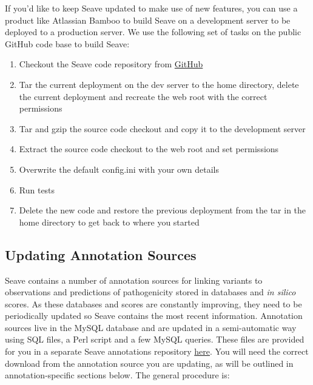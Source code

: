 \documentclass[11pt, a4paper]{article}
\begin{document}
If you'd like to keep Seave updated to make use of new features, you can use a product like Atlassian Bamboo to build Seave on a development server to be deployed to a production server. We use the following set of tasks on the public GitHub code base to build Seave:

\begin{enumerate}
\item Checkout the Seave code repository from \href{https://github.com/KCCG/seave}{GitHub}
\item Tar the current deployment on the dev server to the home directory, delete the current deployment and recreate the web root with the correct permissions
\item Tar and gzip the source code checkout and copy it to the development server 
\item Extract the source code checkout to the web root and set permissions
\item Overwrite the default config.ini with your own details
\item Run tests
\item Delete the new code and restore the previous deployment from the tar in the home directory to get back to where you started
\end{enumerate}


\subsection{Updating Annotation Sources}\label{updateAnnotations}

Seave contains a number of annotation sources for linking variants to observations and predictions of pathogenicity stored in databases and \textit{in silico} scores. As these databases and scores are constantly improving, they need to be periodically updated so Seave contains the most recent information. Annotation sources live in the MySQL database and are updated in a semi-automatic way using SQL files, a Perl script and a few MySQL queries. These files are provided for you in a separate Seave annotations repository \href{https://github.com/KCCG/seave-databases-annotations}{here}. You will need the correct download from the annotation source you are updating, as will be outlined in annotation-specific sections below. The general procedure is:
\end{document}
